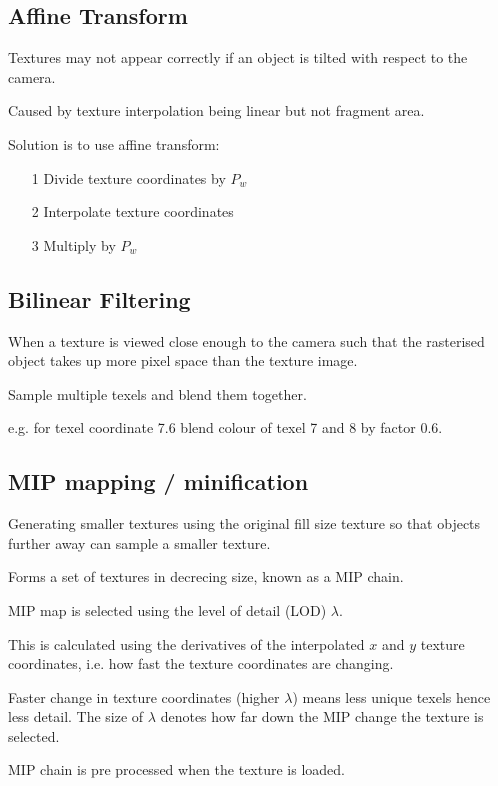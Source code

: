 \documentclass[a4paper]{article}
\begin{document}
\subsection{Affine Transform}

Textures may not appear correctly if an object is tilted with respect to the
camera.

Caused by texture interpolation being linear but not fragment area.

Solution is to use affine transform:

\begin{enumerate}
  \item[1] Divide texture coordinates by $P_{w}$
  \item[2] Interpolate texture coordinates
  \item[3] Multiply by $P_{w}$
\end{enumerate}

\subsection{Bilinear Filtering}

When a texture is viewed close enough to the camera such that the rasterised
object takes up more pixel space than the texture image.

Sample multiple texels and blend them together.

e.g. for texel coordinate 7.6 blend colour of texel 7 and 8 by factor 0.6.

\subsection{MIP mapping /  minification}

Generating smaller textures using the original fill size texture so that objects
further away can sample a smaller texture.

Forms a set of textures in decrecing size, known as a MIP chain.

MIP map is selected using the level of detail (LOD) $\lambda$.

This is calculated using the derivatives of the interpolated $x$ and $y$
texture coordinates, i.e. how fast the texture coordinates are changing.

Faster change in texture coordinates (higher $\lambda$) means less unique texels
hence less detail. The size of $\lambda$ denotes how far down the MIP change the
texture is selected.

MIP chain is pre processed when the texture is loaded.
\end{document}
